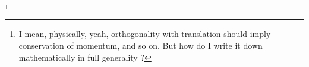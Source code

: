 \item

\notyet\footnote{%
I mean, physically, yeah, orthogonality with translation should imply conservation of momentum, and so on.
But how do I write it down mathematically in full generality ?
}